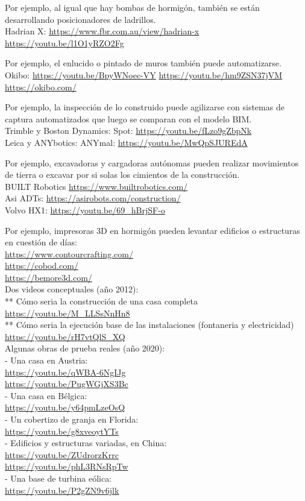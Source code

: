 \documentclass[spanish,12pt,a4paper,final,oneside]{book}
\begin{document}
Por ejemplo, al igual que hay bombas de hormigón, también se están desarrollando posicionadores de ladrillos.
\\Hadrian X: \url{https://www.fbr.com.au/view/hadrian-x}
\\ \url{https://youtu.be/l1O1yRZO2Fg}

Por ejemplo, el enlucido o pintado de muros también puede automatizarse.
\\Okibo: \url{https://youtu.be/BpyWNoec-VY} \hspace{1cm} \url{https://youtu.be/hm9ZSN37jVM}
\\ \url{https://okibo.com/}

Por ejemplo, la inspección de lo construido puede agilizarse con sistemas de captura automatizados que luego se comparan con el modelo BIM.
\\Trimble y Boston Dynamics: Spot: \url{https://youtu.be/fLzo9gZbpNk}
\\Leica y ANYbotics: ANYmal: \url{https://youtu.be/MwQpSJUREdA}

Por ejemplo, excavadoras y cargadoras autónomas pueden realizar movimientos de tierra o excavar por si solas los cimientos de la construcción.
\\BUILT Robotics \url{https://www.builtrobotics.com/}
\\Asi ADTs: \url{https://asirobots.com/construction/}
\\Volvo HX1: \url{https://youtu.be/69_hBrjSF-o}

Por ejemplo, impresoras 3D en hormigón pueden levantar edificios o estructuras en cuestión de días:
\\ \url{https://www.contourcrafting.com/}
\\ \url{https://cobod.com/}
\\ \url{https://bemore3d.com/}
\\Dos videos conceptuales (año 2012):
\\ ** Cómo seria la construcción de una casa completa \\ \url{https://youtu.be/M_LLSsNnHn8}
\\ ** Cómo seria la ejecución base de las instalaciones (fontaneria y electricidad) \\ \url{https://youtu.be/rH7vtQlS_XQ}
\\Algunas obras de prueba reales (año 2020):
\\ - Una casa en Austria: \\ \url{https://youtu.be/qWBA-6NgIJg} \\ \url{https://youtu.be/PugWGjXS3Bc}
\\ - Una casa en Bélgica: \\\url{https://youtu.be/y64pmLzeOsQ}
\\ - Un cobertizo de granja en Florida: \\ \url{https://youtu.be/g8xveoytYTs} 
\\ - Edificios y estructuras variadas, en China: \\ \url{https://youtu.be/ZUdrorzKrrc} \\ \url{https://youtu.be/phL3RNsRpTw}
\\ - Una base de turbina eólica: \\ \url{https://youtu.be/P2gZN9v6jlk}
\end{document}
